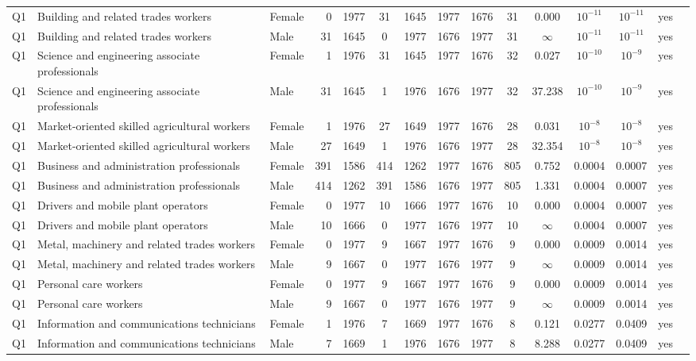 \begin{longtable}{lllrcccccccccll}
Q1 & Building and related trades workers & Female & 0 & 1977 & 31 & 1645 & 1977 & 1676 & 31 & 0.000 & $10^{-11}$ & $10^{-11}$ & yes \\
Q1 & Building and related trades workers & Male & 31 & 1645 & 0 & 1977 & 1676 & 1977 & 31 & $\infty$ & $10^{-11}$ & $10^{-11}$ & yes \\
Q1 & Science and engineering associate professionals & Female & 1 & 1976 & 31 & 1645 & 1977 & 1676 & 32 & 0.027 & $10^{-10}$ & $10^{-9}$ & yes \\
Q1 & Science and engineering associate professionals & Male & 31 & 1645 & 1 & 1976 & 1676 & 1977 & 32 & 37.238 & $10^{-10}$ & $10^{-9}$ & yes \\
Q1 & Market-oriented skilled agricultural workers & Female & 1 & 1976 & 27 & 1649 & 1977 & 1676 & 28 & 0.031 & $10^{-8}$ & $10^{-8}$ & yes \\
Q1 & Market-oriented skilled agricultural workers & Male & 27 & 1649 & 1 & 1976 & 1676 & 1977 & 28 & 32.354 & $10^{-8}$ & $10^{-8}$ & yes \\
Q1 & Business and administration professionals & Female & 391 & 1586 & 414 & 1262 & 1977 & 1676 & 805 & 0.752 & 0.0004 & 0.0007 & yes \\
Q1 & Business and administration professionals & Male & 414 & 1262 & 391 & 1586 & 1676 & 1977 & 805 & 1.331 & 0.0004 & 0.0007 & yes \\
Q1 & Drivers and mobile plant operators & Female & 0 & 1977 & 10 & 1666 & 1977 & 1676 & 10 & 0.000 & 0.0004 & 0.0007 & yes \\
Q1 & Drivers and mobile plant operators & Male & 10 & 1666 & 0 & 1977 & 1676 & 1977 & 10 & $\infty$ & 0.0004 & 0.0007 & yes \\
Q1 & Metal, machinery and related trades workers & Female & 0 & 1977 & 9 & 1667 & 1977 & 1676 & 9 & 0.000 & 0.0009 & 0.0014 & yes \\
Q1 & Metal, machinery and related trades workers & Male & 9 & 1667 & 0 & 1977 & 1676 & 1977 & 9 & $\infty$ & 0.0009 & 0.0014 & yes \\
Q1 & Personal care workers & Female & 0 & 1977 & 9 & 1667 & 1977 & 1676 & 9 & 0.000 & 0.0009 & 0.0014 & yes \\
Q1 & Personal care workers & Male & 9 & 1667 & 0 & 1977 & 1676 & 1977 & 9 & $\infty$ & 0.0009 & 0.0014 & yes \\
Q1 & Information and communications technicians & Female & 1 & 1976 & 7 & 1669 & 1977 & 1676 & 8 & 0.121 & 0.0277 & 0.0409 & yes \\
Q1 & Information and communications technicians & Male & 7 & 1669 & 1 & 1976 & 1676 & 1977 & 8 & 8.288 & 0.0277 & 0.0409 & yes \\

\end{longtable}
